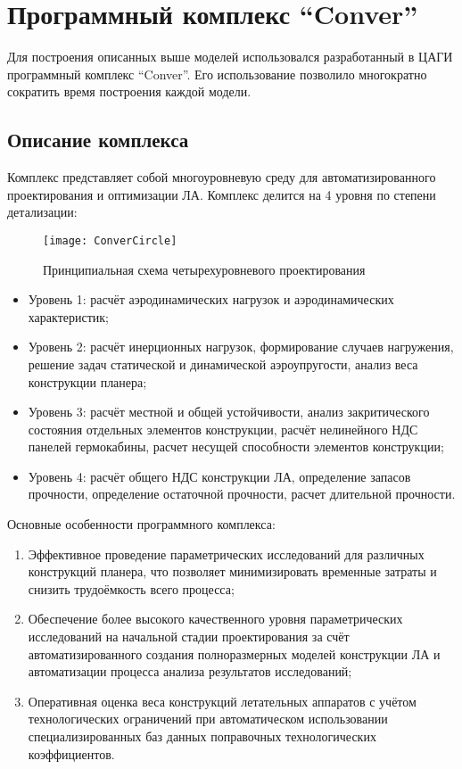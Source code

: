 \section{Программный комплекс ``Conver''}

Для построения описанных выше моделей использовался разработанный в ЦАГИ программный комплекс ``Conver''. Его использование позволило многократно сократить время построения каждой модели. 

\subsection{Описание комплекса}
Комплекс представляет собой многоуровневую среду для автоматизированного проектирования и оптимизации ЛА. Комплекс делится на 4 уровня по степени детализации:



\begin{figure}[ht]
\centering
\texttt{[image: ConverCircle]} 
\caption{Принципиальная схема четырехуровневого проектирования}
\end{figure}



\begin{itemize}
\item Уровень 1: расчёт аэродинамических нагрузок и аэродинамических характеристик; 
\item Уровень 2: расчёт инерционных нагрузок, формирование случаев нагружения, решение задач статической и динамической аэроупругости, анализ веса конструкции планера;
\item Уровень 3: расчёт местной и общей устойчивости, анализ закритического состояния отдельных элементов конструкции, расчёт нелинейного НДС панелей гермокабины, расчет несущей способности элементов конструкции;
\item Уровень 4: расчёт общего НДС конструкции ЛА, определение запасов прочности, определение остаточной прочности, расчет длительной прочности.
\end{itemize}

Основные особенности программного комплекса:

\begin{enumerate}
\item Эффективное проведение параметрических исследований для различных конструкций планера, что позволяет минимизировать временные затраты и снизить трудоёмкость всего процесса;
\item Обеспечение более высокого качественного уровня параметрических исследований на начальной стадии проектирования за счёт автоматизированного создания полноразмерных моделей конструкции ЛА и автоматизации процесса анализа результатов исследований;
\item Оперативная оценка веса конструкций летательных аппаратов с учётом технологических ограничений при автоматическом использовании специализированных баз данных поправочных технологических коэффициентов.
\end{enumerate}


